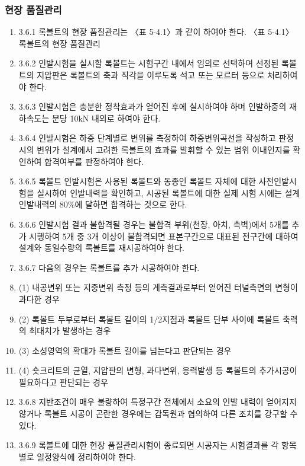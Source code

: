 \documentclass[12pt,a4paper]{article}
\begin{document}
\subsubsection{  현장 품질관리}
\begin{enumerate}
\item  3.6.1 록볼트의 현장 품질관리는 〈표 5-4.1〉과 같이 하여야 한다.  
〈표 5-4.1〉 록볼트의 현장 품질관리
\item  3.6.2 인발시험을 실시할 록볼트는 시험구간 내에서 임의로 선택하며 선정된 록볼트의 지압판은 록볼트의 축과 직각을 이루도록 석고 또는 모르터 등으로 처리하여야 한다.  
\item  3.6.3 인발시험은 충분한 정착효과가 얻어진 후에 실시하여야 하며 인발하중의 재하속도는 분당 10kN 내외로 하여야 한다.  
\item  3.6.4 인발시험은 하중 단계별로 변위를 측정하여 하중변위곡선을 작성하고 판정 시의 변위가 설계에서 고려한 록볼트의 효과를 발휘할 수 있는 범위 이내인지를 확인하여 합격여부를 판정하여야 한다.  
\item  3.6.5 록볼트 인발시험은 사용된 록볼트와 동종인 록볼트 자체에 대한 사전인발시험을 실시하여 인발내력을 확인하고, 시공된 록볼트에 대한 실제 시험 시에는 설계인발내력의 80\%에 달하면 합격하는 것으로 한다.  
\item  3.6.6 인발시험 결과 불합격될 경우는 불합격 부위(천장, 아치, 측벽)에서 5개를 추가 시행하여 5개 중 3개 이상이 불합격되면 표본구간으로 대표된 전구간에 대하여 설계와 동일수량의 록볼트를 재시공하여야 한다.  
\item  3.6.7 다음의 경우는 록볼트를 추가 시공하여야 한다.  
\item  (1) 내공변위 또는 지중변위 측정 등의 계측결과로부터 얻어진 터널측면의 변형이 과다한 경우 
\item  (2) 록볼트 두부로부터 록볼트 길이의 1/2지점과 록볼트 단부 사이에 록볼트 축력의 최대치가 발생하는 경우 
\item  (3) 소성영역의 확대가 록볼트 길이를 넘는다고 판단되는 경우 
\item  (4) 숏크리트의 균열, 지압판의 변형, 과다변위, 응력발생 등 록볼트의 추가시공이 필요하다고 판단되는 경우 
 
\item  3.6.8 지반조건이 매우 불량하여 특정구간 전체에서 소요의 인발 내력이 얻어지지 않거나 록볼트 시공이 곤란한 경우에는 감독원과 협의하여 다른 조치를 강구할 수 있다.  
\item  3.6.9 록볼트에 대한 현장 품질관리시험이 종료되면 시공자는 시험결과를 각 항목별로 일정양식에 정리하여야 한다.  
\end{enumerate}


 
\end{document}
